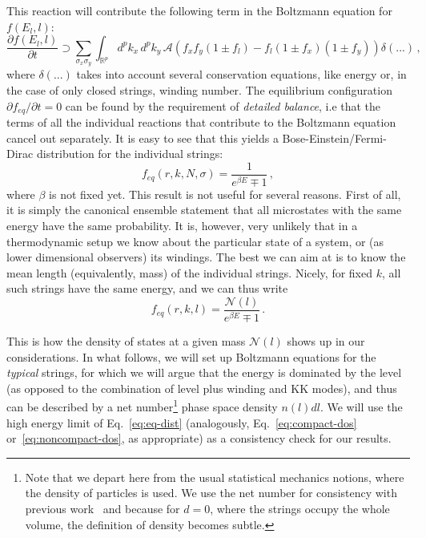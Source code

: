 \documentclass[a4paper,11pt]{article}
\newcommand{\lr}[1]{\left(#1\right)}
\begin{document}
This reaction will contribute the following term in the Boltzmann equation for $f(E_l,l)$:
\begin{equation}
    \frac{\partial f(E_l,l)}{\partial t} \supset \sum_{\sigma_x \sigma_y}{\int_{\mathbb{R}^p}{d^pk_x \, d^p k_y\, \mathcal{A} \lr{ f_xf_y\lr{1\pm f_l}-f_l\lr{1\pm f_x}\lr{1\pm f_y}}}\delta(...)} \,,
\end{equation}
where $\delta(...)$ takes into account several conservation equations, like energy or, in the case of only closed strings, winding number.
The equilibrium configuration $\partial f_{eq}/\partial t=0$ can be found by the requirement of \textit{detailed balance}, i.e that the terms of all the individual reactions that contribute to the Boltzmann equation cancel out separately.
It is easy to see that this yields a Bose-Einstein/Fermi-Dirac distribution for the individual strings:
\begin{equation}
    f_{eq}(r,k,N,\sigma)=\frac{1}{e^{\beta E}\mp 1}\, ,
\end{equation}
where $\beta$ is not fixed yet.
This result is not useful for several reasons. 
First of all, it is simply the canonical ensemble statement that all microstates with the same energy have the same probability.
It is, however, very unlikely that in a thermodynamic setup we know about the particular state of a system, or (as lower dimensional observers) its windings.
The best we can aim at is to know the mean length (equivalently, mass) of the individual strings. 
Nicely, for fixed $k$, all such strings have the same energy, and we can thus write
\begin{equation}\label{eq:eq-dist}
    f_{eq}(r,k,l)=\frac{\mathcal{N}(l)}{e^{\beta E}\mp 1}\, .
\end{equation}

This is how the density of states at a given mass $\mathcal{N}(l)$ shows up in our considerations.
In what follows, we will set up Boltzmann equations for the \textit{typical} strings, for which we will argue that the energy is dominated by the level (as opposed to the combination of level plus winding and KK modes), and thus can be described by a net number\footnote{Note that we depart here from the usual statistical mechanics notions, where the density of particles is used. We use the net number for consistency with previous work~\cite{Lowe:1994nm,Lee:1997iz} and because for $d=0$, where the strings occupy the whole volume, the definition of density becomes subtle.} phase space density $n(l)dl$.
We will use the high energy limit of Eq.~\eqref{eq:eq-dist} (analogously, Eq.~\eqref{eq:compact-dos} or~\eqref{eq:noncompact-dos}, as appropriate) as a consistency check for our results.
\\
\end{document}
